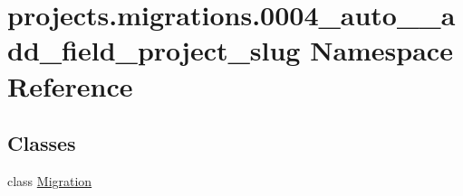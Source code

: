 \hypertarget{namespaceprojects_1_1migrations_1_10004__auto____add__field__project__slug}{\section{projects.\-migrations.0004\-\_\-auto\-\_\-\-\_\-add\-\_\-field\-\_\-project\-\_\-slug Namespace Reference}
\label{namespaceprojects_1_1migrations_1_10004__auto____add__field__project__slug}
}
\subsection*{Classes}
\begin{DoxyCompactItemize}
\item 
class \hyperlink{classprojects_1_1migrations_1_10004__auto____add__field__project__slug_1_1_migration}{Migration}
\end{DoxyCompactItemize}
